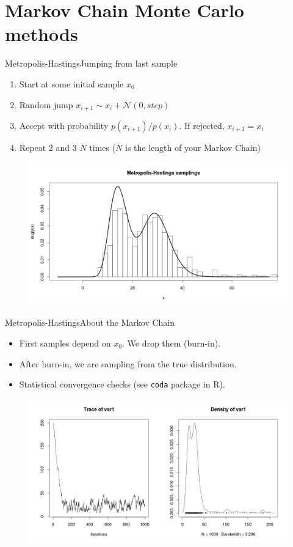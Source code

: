 \documentclass{beamer}
\begin{document}
\section{Markov Chain Monte Carlo methods}
\begin{frame}{Metropolis-Hastings}{Jumping from last sample}
	\begin{enumerate}
		\item Start at some initial sample $x_0$
		\item Random jump $x_{i+1} \sim x_i + \mathcal{N}(0,step)$
		\item Accept with probability $p(x_{i+1})/p(x_i)$. If rejected, $x_{i+1} = x_i$
		\item Repeat 2 and 3 $N$ times ($N$ is the length of your Markov Chain)
	\end{enumerate}

	\begin{figure}
		\centering
		\includegraphics[width=\textwidth]{metropolis_unidimensional.png}
	\end{figure}
\end{frame}

\begin{frame}{Metropolis-Hastings}{About the Markov Chain}
	\begin{itemize}
		\item First samples depend on $x_0$. We drop them (burn-in).
		\item After burn-in, we are sampling from the true distribution.
		\item Statistical convergence checks (see \texttt{coda} package in R).
	\end{itemize}
	\begin{figure}
		\centering
		\includegraphics[width=\textwidth]{metropolis_traces.png}
	\end{figure}
\end{frame}
\end{document}
